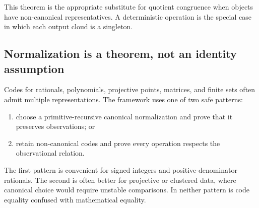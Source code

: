 This theorem is the appropriate substitute for quotient congruence when
objects have non-canonical representatives.  A deterministic operation is the
special case in which each output cloud is a singleton.

\subsection{Normalization is a theorem, not an identity assumption}

Codes for rationals, polynomials, projective points, matrices, and finite sets
often admit multiple representations.  The framework uses one of two safe
patterns:

\begin{enumerate}
\item choose a primitive-recursive canonical normalization and prove that it
      preserves observations; or
\item retain non-canonical codes and prove every operation respects the
      observational relation.
\end{enumerate}

The first pattern is convenient for signed integers and positive-denominator
rationals.  The second is often better for projective or clustered data, where
canonical choice would require unstable comparisons.  In neither pattern is
code equality confused with mathematical equality.
